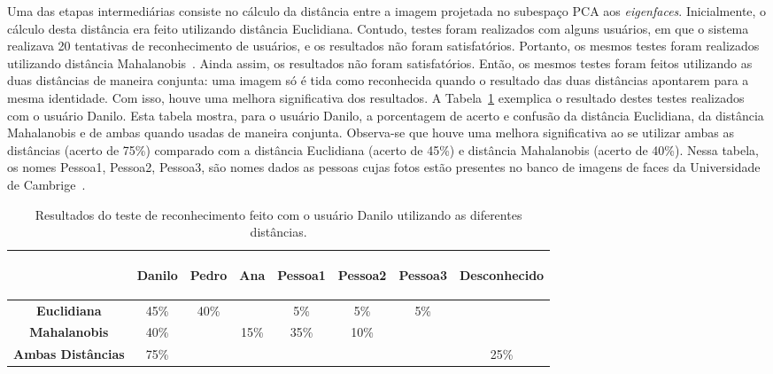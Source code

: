 		Uma das etapas intermediárias consiste no cálculo da distância entre a imagem projetada no subespaço PCA aos \textit{eigenfaces}. Inicialmente, o cálculo desta distância era feito utilizando distância Euclidiana. Contudo, testes foram realizados com alguns usuários, em que o sistema realizava 20 tentativas de reconhecimento de usuários, e os resultados não foram satisfatórios. Portanto, os mesmos testes foram realizados utilizando distância Mahalanobis~\cite{perlibakas}. Ainda assim, os resultados não foram satisfatórios. Então, os mesmos testes foram feitos utilizando as duas distâncias de maneira conjunta: uma imagem só é tida como reconhecida quando o resultado das duas distâncias apontarem para a mesma identidade. Com isso, houve uma melhora significativa dos resultados. A Tabela~\ref{tab:distancias} exemplica o resultado destes testes realizados com o usuário Danilo. Esta tabela mostra, para o usuário Danilo, a porcentagem de acerto e confusão da distância Euclidiana, da distância Mahalanobis e de ambas quando usadas de maneira conjunta. Observa-se que houve uma melhora significativa ao se utilizar ambas as distâncias (acerto de 75\%) comparado com a distância Euclidiana (acerto de 45\%) e distância Mahalanobis (acerto de 40\%). Nessa tabela, os nomes Pessoa1, Pessoa2, Pessoa3, são nomes dados as pessoas cujas fotos estão presentes no banco de imagens de faces da Universidade de Cambrige~\cite{cambridgeFaceDb}.

		\begin{table}[H]
		\begin{center}
			\caption{Resultados do teste de reconhecimento feito com o usuário Danilo utilizando as diferentes distâncias.}
			\label{tab:distancias}
			\begin{tabular}{|c|c|c|c|c|c|c|c|}
				\hline & \bf \begin{sideways}Danilo\end{sideways} & \bf \begin{sideways}Pedro\end{sideways} & \bf \begin{sideways}Ana\end{sideways} & \bf \begin{sideways}Pessoa1\end{sideways} & \bf \begin{sideways}Pessoa2\end{sideways} & \bf \begin{sideways}Pessoa3\end{sideways} & \bf \begin{sideways}Desconhecido\end{sideways}\\
				\hline \bf Euclidiana & 45\% & 40\% & & 5\% & 5\% & 5\% &\\
				\hline \bf Mahalanobis & 40\% & & 15\% & 35\% & 10\% & &\\
				\hline \bf Ambas Distâncias & 75\% & & & & & & 25\%\\
				\hline
			\end{tabular}
		\end{center}
	\end{table}

